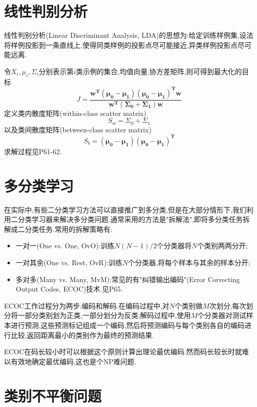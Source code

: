 \section{线性判别分析}

线性判别分析(Linear Discriminant Analysis, LDA)的思想为:给定训练样例集,设法将样例投影到一条直线上,使得同类样例的投影点尽可能接近,异类样例投影点尽可能远离.

令$X_i,\mu_i,\Sigma_i$分别表示第$i$类示例的集合,均值向量,协方差矩阵,则可得到最大化的目标
\begin{equation}
J=\frac{\mathbf{w^T(\mu_0-\mu_1)(\mu_0-\mu_1)^Tw}}{\mathbf{w^T(\Sigma_0+\Sigma_1)w}}
\end{equation}
定义类内散度矩阵(within-class scatter matrix)
\begin{equation}
S_w=\Sigma_0+\Sigma_1
\end{equation}
以及类间散度矩阵(between-class scatter matrix)
\begin{equation}
S_b=\mathbf{(\mu_0-\mu_1)(\mu_0-\mu_1)^T}
\end{equation}
求解过程见P61-62.

\section{多分类学习}

在实际中,有些二分类学习方法可以直接推广到多分类,但是在大部分情形下,我们利用二分类学习器来解决多分类问题.通常采用的方法是"拆解法",即将多分类任务拆解成二分类任务.常用的拆解策略有:
\begin{itemize}
\item 一对一(One vs. One, OvO):训练$N(N-1)/2$个分类器将$N$个类别两两分开;
\item 一对其余(One vs. Rest, OvR):训练$N$个分类器,将每个样本与其余的样本分开;
\item 多对多(Many vs. Many, MvM):常见的有"纠错输出编码"(Error Correcting Output Codes, ECOC)技术.见P65.
\end{itemize}

ECOC工作过程分为两步:编码和解码.在编码过程中,对$N$个类别做$M$次划分,每次划分将一部分类别划为正类,一部分划分为反类;解码过程中,使用$M$个分类器对测试样本进行预测,这些预测标记组成一个编码,然后将预测编码与每个类别各自的编码进行比较,返回距离最小的类别作为最终的预测结果.

ECOC在码长较小时可以根据这个原则计算出理论最优编码.然而码长较长时就难以有效地确定最优编码,这也是个NP难问题.

\section{类别不平衡问题}

